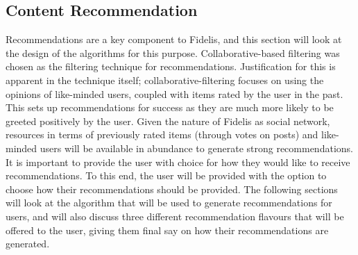 \subsection{Content Recommendation}
Recommendations are a key component to Fidelis, and this section will look at the design of the algorithms for this purpose. Collaborative-based filtering was chosen as the filtering technique for recommendations. Justification for this is apparent in the technique itself; collaborative-filtering focuses on using the opinions of like-minded users, coupled with items rated by the user in the past. This sets up recommendations for success as they are much more likely to be greeted positively by the user. Given the nature of Fidelis as social network, resources in terms of previously rated items (through votes on posts) and like-minded users will be available in abundance to generate strong recommendations. It is important to provide the user with choice for how they would like to receive recommendations. To this end, the user will be provided with the option to choose how their recommendations should be provided. The following sections will look at the algorithm that will be used to generate recommendations for users, and will also discuss three different recommendation flavours that will be offered to the user, giving them final say on how their recommendations are generated. 


